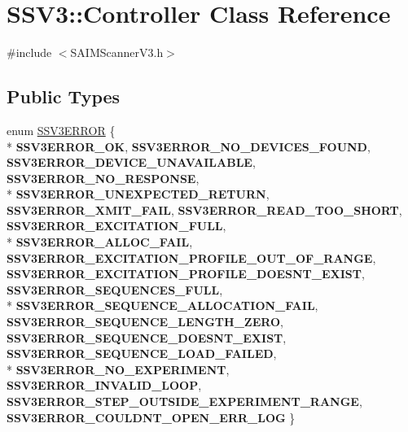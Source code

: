 \hypertarget{classSSV3_1_1Controller}{\section{S\-S\-V3\-:\-:Controller Class Reference}
\label{classSSV3_1_1Controller}
}


{\ttfamily \#include $<$S\-A\-I\-M\-Scanner\-V3.\-h$>$}

\subsection*{Public Types}
\begin{DoxyCompactItemize}
\item 
enum \hyperlink{classSSV3_1_1Controller_a8ff24a92ec373aa1257dcfe2aa2e5406}{S\-S\-V3\-E\-R\-R\-O\-R} \{ \\*
{\bfseries S\-S\-V3\-E\-R\-R\-O\-R\-\_\-\-O\-K}, 
{\bfseries S\-S\-V3\-E\-R\-R\-O\-R\-\_\-\-N\-O\-\_\-\-D\-E\-V\-I\-C\-E\-S\-\_\-\-F\-O\-U\-N\-D}, 
{\bfseries S\-S\-V3\-E\-R\-R\-O\-R\-\_\-\-D\-E\-V\-I\-C\-E\-\_\-\-U\-N\-A\-V\-A\-I\-L\-A\-B\-L\-E}, 
{\bfseries S\-S\-V3\-E\-R\-R\-O\-R\-\_\-\-N\-O\-\_\-\-R\-E\-S\-P\-O\-N\-S\-E}, 
\\*
{\bfseries S\-S\-V3\-E\-R\-R\-O\-R\-\_\-\-U\-N\-E\-X\-P\-E\-C\-T\-E\-D\-\_\-\-R\-E\-T\-U\-R\-N}, 
{\bfseries S\-S\-V3\-E\-R\-R\-O\-R\-\_\-\-X\-M\-I\-T\-\_\-\-F\-A\-I\-L}, 
{\bfseries S\-S\-V3\-E\-R\-R\-O\-R\-\_\-\-R\-E\-A\-D\-\_\-\-T\-O\-O\-\_\-\-S\-H\-O\-R\-T}, 
{\bfseries S\-S\-V3\-E\-R\-R\-O\-R\-\_\-\-E\-X\-C\-I\-T\-A\-T\-I\-O\-N\-\_\-\-F\-U\-L\-L}, 
\\*
{\bfseries S\-S\-V3\-E\-R\-R\-O\-R\-\_\-\-A\-L\-L\-O\-C\-\_\-\-F\-A\-I\-L}, 
{\bfseries S\-S\-V3\-E\-R\-R\-O\-R\-\_\-\-E\-X\-C\-I\-T\-A\-T\-I\-O\-N\-\_\-\-P\-R\-O\-F\-I\-L\-E\-\_\-\-O\-U\-T\-\_\-\-O\-F\-\_\-\-R\-A\-N\-G\-E}, 
{\bfseries S\-S\-V3\-E\-R\-R\-O\-R\-\_\-\-E\-X\-C\-I\-T\-A\-T\-I\-O\-N\-\_\-\-P\-R\-O\-F\-I\-L\-E\-\_\-\-D\-O\-E\-S\-N\-T\-\_\-\-E\-X\-I\-S\-T}, 
{\bfseries S\-S\-V3\-E\-R\-R\-O\-R\-\_\-\-S\-E\-Q\-U\-E\-N\-C\-E\-S\-\_\-\-F\-U\-L\-L}, 
\\*
{\bfseries S\-S\-V3\-E\-R\-R\-O\-R\-\_\-\-S\-E\-Q\-U\-E\-N\-C\-E\-\_\-\-A\-L\-L\-O\-C\-A\-T\-I\-O\-N\-\_\-\-F\-A\-I\-L}, 
{\bfseries S\-S\-V3\-E\-R\-R\-O\-R\-\_\-\-S\-E\-Q\-U\-E\-N\-C\-E\-\_\-\-L\-E\-N\-G\-T\-H\-\_\-\-Z\-E\-R\-O}, 
{\bfseries S\-S\-V3\-E\-R\-R\-O\-R\-\_\-\-S\-E\-Q\-U\-E\-N\-C\-E\-\_\-\-D\-O\-E\-S\-N\-T\-\_\-\-E\-X\-I\-S\-T}, 
{\bfseries S\-S\-V3\-E\-R\-R\-O\-R\-\_\-\-S\-E\-Q\-U\-E\-N\-C\-E\-\_\-\-L\-O\-A\-D\-\_\-\-F\-A\-I\-L\-E\-D}, 
\\*
{\bfseries S\-S\-V3\-E\-R\-R\-O\-R\-\_\-\-N\-O\-\_\-\-E\-X\-P\-E\-R\-I\-M\-E\-N\-T}, 
{\bfseries S\-S\-V3\-E\-R\-R\-O\-R\-\_\-\-I\-N\-V\-A\-L\-I\-D\-\_\-\-L\-O\-O\-P}, 
{\bfseries S\-S\-V3\-E\-R\-R\-O\-R\-\_\-\-S\-T\-E\-P\-\_\-\-O\-U\-T\-S\-I\-D\-E\-\_\-\-E\-X\-P\-E\-R\-I\-M\-E\-N\-T\-\_\-\-R\-A\-N\-G\-E}, 
{\bfseries S\-S\-V3\-E\-R\-R\-O\-R\-\_\-\-C\-O\-U\-L\-D\-N\-T\-\_\-\-O\-P\-E\-N\-\_\-\-E\-R\-R\-\_\-\-L\-O\-G}
 \}
\end{DoxyCompactItemize}
